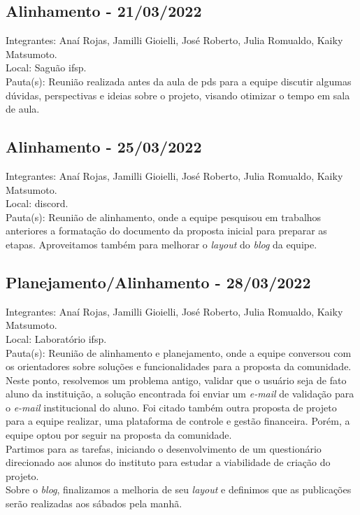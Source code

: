 \subsection{Alinhamento - 21/03/2022}
\noindent Integrantes: Anaí Rojas, Jamilli Gioielli, José Roberto, Julia Romualdo, Kaiky Matsumoto. \\
Local: Saguão \acs{ifsp}.\\
Pauta(s): Reunião realizada antes da aula de \acs{pds} para a equipe discutir algumas dúvidas, perspectivas e ideias sobre o projeto, visando otimizar o tempo em sala de aula.

\subsection{Alinhamento - 25/03/2022}
\noindent Integrantes: Anaí Rojas, Jamilli Gioielli, José Roberto, Julia Romualdo, Kaiky Matsumoto. \\
Local: \gls{discord}.\\
Pauta(s): Reunião de alinhamento, onde a equipe pesquisou em trabalhos anteriores a formatação do documento da proposta inicial para preparar as etapas. 
Aproveitamos também para melhorar o \textsl{layout} do \textsl{blog} da equipe.

\subsection{Planejamento/Alinhamento - 28/03/2022}
\noindent Integrantes: Anaí Rojas, Jamilli Gioielli, José Roberto, Julia Romualdo, Kaiky Matsumoto. \\
Local: Laboratório \acs{ifsp}.\\
Pauta(s): Reunião de alinhamento e planejamento, onde a equipe conversou com os orientadores sobre soluções e funcionalidades para a proposta da comunidade. Neste ponto, resolvemos um problema antigo, validar que o usuário seja de fato aluno da instituição, a solução encontrada foi enviar um \textsl{e-mail} de validação para o \textsl{e-mail} institucional do aluno. Foi citado também outra proposta de projeto para a equipe realizar, uma plataforma de controle e gestão financeira. Porém, a equipe optou por seguir na proposta da comunidade.\\
Partimos para as tarefas, iniciando o desenvolvimento de um questionário direcionado aos alunos do instituto para estudar a viabilidade de criação do projeto.\\
Sobre o \textsl{blog}, finalizamos a melhoria de seu \textsl{layout} e definimos que as publicações serão realizadas aos sábados pela manhã.

